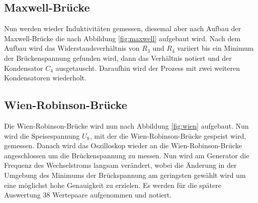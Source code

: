 \subsection{Maxwell-Brücke}

Nun werden wieder Induktivitäten gemessen, diesemal aber nach Aufbau der Maxwell-Brücke die nach Abbildung \ref{fig:maxwell} aufgebaut wird.
Nach dem Aufbau wird das Widerstandsverhältnis von $R_3$ und $R_4$ variiert bis ein Minimum der Brückenspannung gefunden wird, dann das Verhältnis notiert und der Kondensator $C_4$ ausgetauscht.
Daraufhin wird der Prozess mit zwei weiteren Kondensatoren wiederholt.

\subsection{Wien-Robinson-Brücke}

Die Wien-Robinson-Brücke wird nun nach Abbildung \ref{fig:wien} aufgebaut. 
Nun wird die Speisespannung $U_\text{S}$, mit der die Wien-Robinson-Brücke gespeist wird, gemessen.
Danach wird das Oszilloskop wieder an die Wien-Robinson-Brücke angeschlossen um die Brückenspannung zu messen.
Nun wird am Generator die Frequenz des Wechselstroms langsam verändert, wobei die Änderung in der Umgebung des Minimums der Brückspannung am geringsten gewählt wird um eine möglichst hohe Genauigkeit zu erzielen. 
Es werden für die spätere Auswertung 38 Wertepaare aufgenommen und notiert.



 
